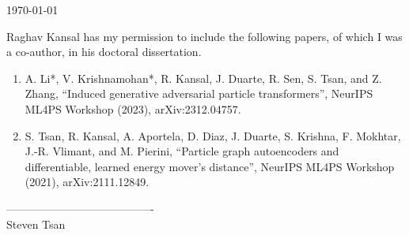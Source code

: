 \documentclass{article}
\begin{document}
\today

Raghav Kansal has my permission to include the following papers, of which
I was a co-author, in his doctoral dissertation.

\begin{enumerate}
    \item A. Li*, V. Krishnamohan*, R. Kansal, J. Duarte, R. Sen, S. Tsan, and Z. Zhang, “Induced generative adversarial particle transformers”, NeurIPS ML4PS Workshop (2023), arXiv:2312.04757.
    \item S. Tsan, R. Kansal, A. Aportela, D. Diaz, J. Duarte, S. Krishna, F. Mokhtar, J.-R. Vlimant, and M. Pierini, “Particle graph autoencoders and differentiable, learned energy mover's distance”, NeurIPS ML4PS Workshop (2021), arXiv:2111.12849.
\end{enumerate}

\baselineskip
----------------------------------------\\
Steven Tsan
\end{document}
